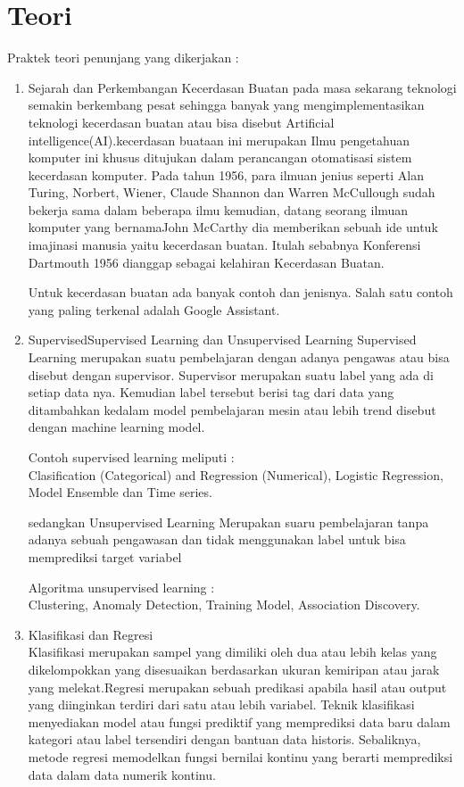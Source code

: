 \section{Teori}
Praktek teori penunjang yang dikerjakan :
\begin{enumerate}
\item
Sejarah dan Perkembangan Kecerdasan Buatan
pada masa sekarang teknologi semakin berkembang pesat sehingga banyak yang mengimplementasikan teknologi kecerdasan buatan atau bisa disebut Artificial intelligence(AI).kecerdasan buataan ini merupakan Ilmu pengetahuan komputer ini khusus ditujukan dalam perancangan otomatisasi sistem kecerdasan komputer. Pada tahun 1956, para ilmuan jenius seperti Alan Turing, Norbert, Wiener, Claude Shannon dan Warren McCullough sudah bekerja sama dalam beberapa ilmu kemudian, datang seorang ilmuan komputer yang bernamaJohn McCarthy dia memberikan sebuah ide untuk imajinasi manusia yaitu kecerdasan buatan. Itulah sebabnya Konferensi Dartmouth 1956 dianggap sebagai kelahiran Kecerdasan Buatan.

Untuk kecerdasan buatan ada banyak contoh dan jenisnya.  Salah satu contoh yang paling terkenal adalah Google Assistant.  
\item
SupervisedSupervised Learning dan Unsupervised Learning
Supervised Learning merupakan suatu pembelajaran dengan adanya pengawas atau bisa disebut dengan supervisor. Supervisor merupakan suatu label yang ada di setiap data nya. Kemudian label tersebut berisi tag dari data yang ditambahkan kedalam model pembelajaran mesin atau lebih trend disebut dengan machine learning model.

Contoh supervised learning meliputi :\\
Clasification (Categorical) and Regression (Numerical),
Logistic Regression, Model Ensemble dan Time series.

sedangkan Unsupervised Learning Merupakan suaru pembelajaran tanpa adanya sebuah pengawasan dan tidak menggunakan label untuk bisa memprediksi target variabel

Algoritma unsupervised learning :\\
 Clustering,
Anomaly Detection,
    Training Model,
    Association Discovery.

\item
Klasifikasi dan Regresi\\
 Klasifikasi merupakan sampel yang dimiliki oleh dua atau lebih kelas yang dikelompokkan yang disesuaikan berdasarkan ukuran kemiripan atau jarak yang melekat.Regresi merupakan sebuah predikasi apabila hasil atau output yang diinginkan terdiri dari satu atau lebih variabel.
Teknik klasifikasi menyediakan model atau fungsi prediktif yang memprediksi data baru dalam kategori atau label tersendiri dengan bantuan data historis. Sebaliknya, metode regresi memodelkan fungsi bernilai kontinu yang berarti memprediksi data dalam data numerik kontinu.


\end{enumerate}
